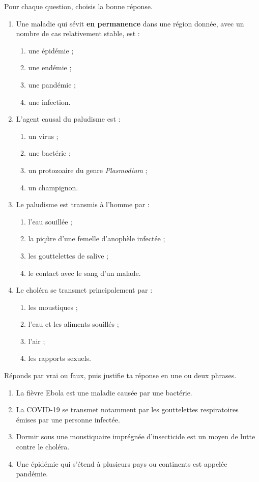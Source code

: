 \documentclass[11pt]{article}
\begin{document}
\begin{exercice}
Pour chaque question, choisis la bonne réponse.
\begin{enumerate}
\item Une maladie qui sévit \textbf{en permanence} dans une région donnée, avec un nombre de cas relativement stable, est :
\begin{enumerate}
\item une épidémie ; \item une endémie ; \item une pandémie ; \item une infection.
\end{enumerate}
\item L'agent causal du paludisme est :
\begin{enumerate}
\item un virus ; \item une bactérie ; \item un protozoaire du genre \emph{Plasmodium} ; \item un champignon.
\end{enumerate}
\item Le paludisme est transmis à l'homme par :
\begin{enumerate}
\item l'eau souillée ; \item la piqûre d'une femelle d'anophèle infectée ; \item les gouttelettes de salive ; \item le contact avec le sang d'un malade.
\end{enumerate}
\item Le choléra se transmet principalement par :
\begin{enumerate}
\item les moustiques ; \item l'eau et les aliments souillés ; \item l'air ; \item les rapports sexuels.
\end{enumerate}
\end{enumerate}
\end{exercice}

\begin{exercice}
Réponds par vrai ou faux, puis justifie ta réponse en une ou deux phrases.
\begin{enumerate}
\item La fièvre Ebola est une maladie causée par une bactérie.
\item La COVID-19 se transmet notamment par les gouttelettes respiratoires émises par une personne infectée.
\item Dormir sous une moustiquaire imprégnée d'insecticide est un moyen de lutte contre le choléra.
\item Une épidémie qui s'étend à plusieurs pays ou continents est appelée pandémie.
\end{enumerate}
\end{exercice}
\end{document}
